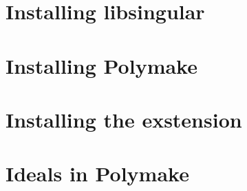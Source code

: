 \documentclass[a4paper]{article}
\begin{document}
\section{Installing libsingular}

\section{Installing Polymake}

\section{Installing the exstension}

\section{Ideals in Polymake}
\end{document}
